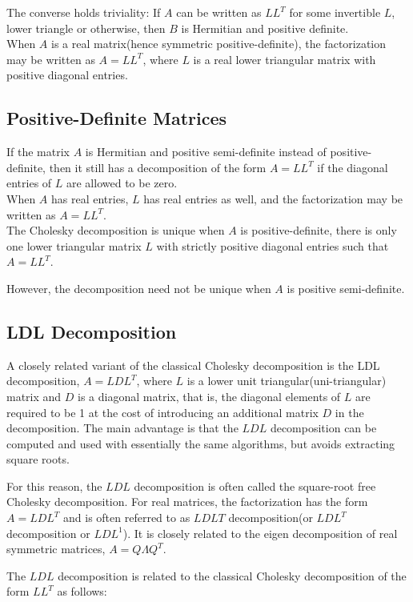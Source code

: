 \documentclass[a4paper, 12pt]{report}
\begin{document}
{The converse holds triviality: If $A$ can be written as $LL^T$ for some invertible $L$, lower triangle or otherwise, then $B$ is Hermitian and positive definite.\\

When $A$ is a real matrix(hence symmetric positive-definite), the factorization may be written as $A=LL^T$, where $L$ is a real lower triangular matrix with positive diagonal entries.
	

\subsection{Positive-Definite Matrices}
If the matrix $A$ is Hermitian and positive semi-definite instead of positive-definite, then it still has a decomposition  of the form $A=LL^T$ if the diagonal entries of $L$ are allowed to be zero.\\
When $A$ has real entries, $L$ has real entries as well, and the factorization may be written as $A=LL^T$.\\
The Cholesky decomposition is unique when $A$ is positive-definite, there is only one lower triangular matrix $L$ with strictly positive diagonal entries such that $A=LL^T$.

However, the decomposition need not be unique when $A$ is positive semi-definite.

\subsection{LDL Decomposition}
A closely related variant of the classical Cholesky decomposition is the LDL decomposition, $A=LDL^T$, where $L$ is a lower unit triangular(uni-triangular) matrix and $D$ is a diagonal matrix, that is, the diagonal elements of $L$ are required to be 1 at the cost of introducing an additional matrix $D$ in the decomposition. The main advantage is that the $LDL$ decomposition can be computed and used with essentially the same algorithms, but avoids extracting square roots.

For this reason, the $LDL$ decomposition is often called the square-root free Cholesky decomposition. For real matrices, the factorization has the form $A=LDL^T$ and is often referred to as $LDLT$ decomposition(or $LDL^T$ decomposition or $LDL^1$). It is closely related to the eigen decomposition of real symmetric matrices, $A=Q\Lambda Q^T$.

The $LDL$ decomposition is related to the classical Cholesky decomposition of the form $LL^T$ as follows:

}
\end{document}

